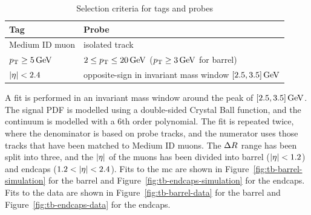 \begin{table}[!htb]
	\centering
	\label{tab:tag-probe-def}
		\caption{Selection criteria for tags and probes}
			\begin{tabular}{l|l} \hline
			Tag & Probe \\ \hline
			Medium ID muon & isolated track\\
			$p_{\mathrm{T}} \geq 5\,\text{Ge\hspace{-.08em}V}$ & $2\leq p_{\mathrm{T}}\leq 20\,\text{Ge\hspace{-.08em}V}$  ($ p_{\mathrm{T}}\geq 3 \,\text{Ge\hspace{-.08em}V} $ for barrel) \\
			$\lvert \eta \rvert<2.4$ & opposite-sign in invariant mass window $[2.5,3.5]\,\text{Ge\hspace{-.08em}V}$ \\ \hline
			\end{tabular}
\end{table}

A fit is performed in an invariant mass window around the \JPsi peak of $[2.5,3.5]\,\text{Ge\hspace{-.08em}V}$. The signal PDF is modelled using a double-sided Crystal Ball function, and the continuum is modelled with a 6th order polynomial. The fit is repeated twice, where the denominator is based on probe tracks, and the numerator uses those tracks that have been matched to Medium ID muons. The $\Delta R$ range has been split into three, and the $\lvert \eta \rvert$ of the muons has been divided into barrel ($\lvert \eta \rvert<1.2$) and endcaps ($1.2<\lvert \eta \rvert<2.4$). Fits to the \gls{mc} are shown in Figure~\ref{fig:tb-barrel-simulation} for the barrel and Figure~\ref{fig:tb-endcaps-simulation} for the endcaps. Fits to the data are shown in Figure~\ref{fig:tb-barrel-data} for the barrel and Figure~\ref{fig:tb-endcaps-data} for the endcaps.

